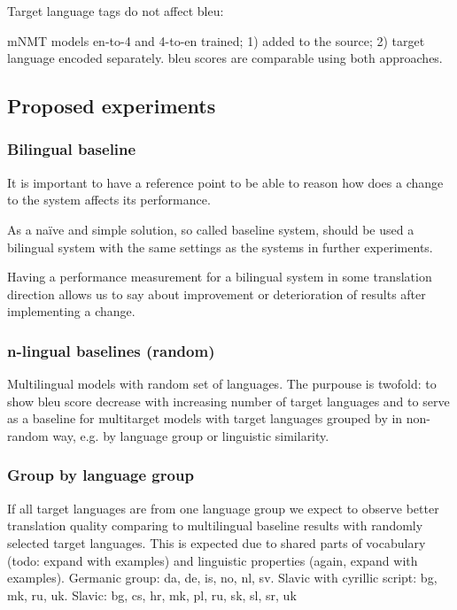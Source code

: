 Target language tags do not affect \acrshort{bleu}:

mNMT models en-to-4 and 4-to-en trained;
 1)  added to the source;
 2) target language encoded separately.
\acrshort{bleu} scores are comparable using both approaches.


\subsection{Proposed experiments}
\label{subsection:proposed_experiments}


\subsubsection*{Bilingual baseline}

It is important to have a reference point to be able to reason how
does a change to the system affects its performance.

As a naïve and simple solution, so called \gls{baseline} system,
should be used a bilingual system with the same settings
as the systems in further experiments.

Having a performance measurement for a bilingual system in some
translation direction allows us to say about improvement or deterioration of results after
implementing a change.



\subsubsection*{n-lingual baselines (random)}

Multilingual models with random set of languages.
The purpouse is twofold: 
to show \acrshort{bleu} score decrease with increasing number of target languages and
to serve as a baseline for multitarget models with target languages grouped by
in non-random way, e.g. by language group or linguistic similarity.


\subsubsection*{Group by language group}

If all target languages are from one language group we expect to observe
better translation quality comparing to multilingual baseline results 
with randomly selected target languages.
This is expected due to shared parts of vocabulary (todo: expand with examples)
and linguistic properties (again, expand with examples).
Germanic group: da, de, is, no, nl, sv.
Slavic with cyrillic script: bg, mk, ru, uk.
Slavic: bg, cs, hr, mk, pl, ru, sk, sl, sr, uk



